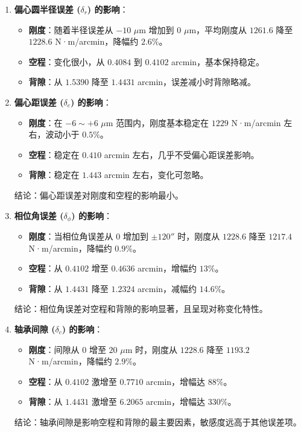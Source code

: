\documentclass[12pt]{ctexart}
\begin{document}
\begin{enumerate}
    \item \textbf{偏心圆半径误差 ($\delta_r$) 的影响}：
    \begin{itemize}
        \item \textbf{刚度}：随着半径误差从 $-10$ $\mu$m 增加到 $0$ $\mu$m，平均刚度从 $1261.6$ 降至 $1228.6$ N·m/arcmin，降幅约 $2.6\%$。
        \item \textbf{空程}：变化很小，从 $0.4084$ 到 $0.4102$ arcmin，基本保持稳定。
        \item \textbf{背隙}：从 $1.5390$ 降至 $1.4431$ arcmin，误差减小时背隙略减。
    \end{itemize}

    \item \textbf{偏心距误差 ($\delta_e$) 的影响}：
    \begin{itemize}
        \item \textbf{刚度}：在 $-6 \sim +6$ $\mu$m 范围内，刚度基本稳定在 $1229$ N·m/arcmin 左右，波动小于 $0.5\%$。
        \item \textbf{空程}：稳定在 $0.410$ arcmin 左右，几乎不受偏心距误差影响。
        \item \textbf{背隙}：稳定在 $1.443$ arcmin 左右，变化可忽略。
    \end{itemize}
    结论：偏心距误差对刚度和空程的影响最小。

    \item \textbf{相位角误差 ($\delta_\phi$) 的影响}：
    \begin{itemize}
        \item \textbf{刚度}：当相位角误差从 $0$ 增加到 $\pm 120''$ 时，刚度从 $1228.6$ 降至 $1217.4$ N·m/arcmin，降幅约 $0.9\%$。
        \item \textbf{空程}：从 $0.4102$ 增至 $0.4636$ arcmin，增幅约 $13\%$。
        \item \textbf{背隙}：从 $1.4431$ 降至 $1.2324$ arcmin，减幅约 $14.6\%$。
    \end{itemize}
    结论：相位角误差对空程和背隙的影响显著，且呈现对称变化特性。

    \item \textbf{轴承间隙 ($\delta_c$) 的影响}：
    \begin{itemize}
        \item \textbf{刚度}：间隙从 $0$ 增至 $20$ $\mu$m 时，刚度从 $1228.6$ 降至 $1193.2$ N·m/arcmin，降幅约 $2.9\%$。
        \item \textbf{空程}：从 $0.4102$ 激增至 $0.7710$ arcmin，增幅达 $88\%$。
        \item \textbf{背隙}：从 $1.4431$ 激增至 $6.2065$ arcmin，增幅达 $330\%$。
    \end{itemize}
    结论：轴承间隙是影响空程和背隙的最主要因素，敏感度远高于其他误差项。
\end{enumerate}
\end{document}
